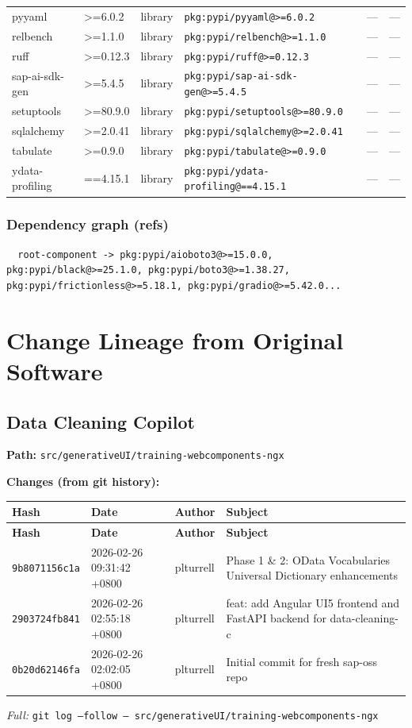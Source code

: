 \documentclass[11pt]{article}
\begin{document}
\begin{longtable}{|l|l|l|p{2.2cm}|l|p{4cm}|}
pyyaml & >=6.0.2 & library & \texttt{pkg:pypi/pyyaml@>=6.0.2} & — & — \\
relbench & >=1.1.0 & library & \texttt{pkg:pypi/relbench@>=1.1.0} & — & — \\
ruff & >=0.12.3 & library & \texttt{pkg:pypi/ruff@>=0.12.3} & — & — \\
sap-ai-sdk-gen & >=5.4.5 & library & \texttt{pkg:pypi/sap-ai-sdk-gen@>=5.4.5} & — & — \\
setuptools & >=80.9.0 & library & \texttt{pkg:pypi/setuptools@>=80.9.0} & — & — \\
sqlalchemy & >=2.0.41 & library & \texttt{pkg:pypi/sqlalchemy@>=2.0.41} & — & — \\
tabulate & >=0.9.0 & library & \texttt{pkg:pypi/tabulate@>=0.9.0} & — & — \\
ydata-profiling & ==4.15.1 & library & \texttt{pkg:pypi/ydata-profiling@==4.15.1} & — & — \\
\hline
\end{longtable}

\subsubsection*{Dependency graph (refs)}
\begin{verbatim}
  root-component -> pkg:pypi/aioboto3@>=15.0.0, pkg:pypi/black@>=25.1.0, pkg:pypi/boto3@>=1.38.27, pkg:pypi/frictionless@>=5.18.1, pkg:pypi/gradio@>=5.42.0...
\end{verbatim}

\newpage
\section{Change Lineage from Original Software}

\subsection{Data Cleaning Copilot}
\textbf{Path:} \texttt{src/generativeUI/training-webcomponents-ngx}

\textbf{Changes (from git history):}
\begin{longtable}{|p{2.2cm}|p{3.2cm}|l|p{6cm}|}
\hline \textbf{Hash} & \textbf{Date} & \textbf{Author} & \textbf{Subject} \\ \hline \endfirsthead
\hline \textbf{Hash} & \textbf{Date} & \textbf{Author} & \textbf{Subject} \\ \hline \endhead
\texttt{9b8071156c1a} & 2026-02-26 09:31:42 +0800 & plturrell & Phase 1 \& 2: OData Vocabularies Universal Dictionary enhancements \\
\texttt{2903724fb841} & 2026-02-26 02:55:18 +0800 & plturrell & feat: add Angular UI5 frontend and FastAPI backend for data-cleaning-c \\
\texttt{0b20d62146fa} & 2026-02-26 02:02:05 +0800 & plturrell & Initial commit for fresh sap-oss repo \\
\hline
\end{longtable}
\textit{Full:} \texttt{git log --follow -- src/generativeUI/training-webcomponents-ngx}
\end{document}

